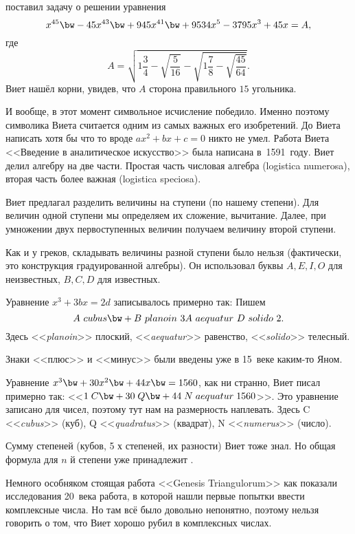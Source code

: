 \documentclass[a4paper,oneside,fleqn,10pt]{article}
\begin{document}
 поставил задачу о
решении уравнения
$$x^{45} \bw- 45x^{43} \bw+ 945x^{41} \bw+ 9534x^5 -3795x^3 + 45x =
A,$$ где
$$A = \sqrt{1\frac34-\sqrt{\frac{5}{16}} - \sqrt{1\frac78 -
    \sqrt{\frac{45}{64}}}}.$$ Виет нашёл корни, увидев, что $A$
сторона правильного $15$ угольника.

И вообще, в этот момент символьное исчисление победило.  Именно
поэтому символика Виета считается одним из самых важных его
изобретений.  До Виета написать хотя бы что то вроде $ax^2 + bx + c =
0$ никто не умел. Работа Виета <<Введение в аналитическое искусство>>
была написана в~1591~году. Виет делил алгебру на две части. Простая
часть числовая алгебра (logistica numerosa), вторая часть более важная
(logistica speciosa).

Виет предлагал разделить величины на ступени (по нашему степени).  Для
величин одной ступени мы определяем их сложение, вычитание.  Далее,
при умножении двух первоступенных величин получаем величину второй
ступени.

Как и у греков, складывать величины разной ступени было нельзя
(фактически, это конструкция градуированной алгебры). Он использовал
буквы $A, E, I, O$ для неизвестных, $B, C, D$ для известных.

\begin{ex}
Уравнение $x^3 + 3bx = 2d$ записывалось примерно так:
Пишем $$A~cubus\bw+B~planoin~3A~aequatur~D~solido~2.$$ Здесь
<<\emph{planoin}>> плоский, <<\emph{aequatur}>> равенство,
<<\emph{solido}>> телесный.
\end{ex}

\begin{note}
Знаки <<плюс>> и <<минус>> были введены уже в 15~веке каким-то Яном.
\end{note}

\begin{ex}
Уравнение $x^3 \bw+ 30 x^2 \bw+ 44 x \bw= 1560$, как ни странно, Виет
писал примерно так: <<$1\;C \bw+ 30\;Q \bw+ 44\;N\;aequatur\;1560$>>.
Это уравнение записано для чисел, поэтому тут нам на размерность
наплевать.  Здесь C <<\emph{cubus}>> (куб), Q <<\emph{quadratus}>>
(квадрат), N <<\emph{numerus}>> (число).
\end{ex}

Сумму степеней (кубов, 5 х степеней, их разности) Виет тоже знал.  Но
общая формула для $n$ й степени уже принадлежит
.

Немного особняком стоящая работа  <<Genesis
Triangulorum>> как показали исследования 20~века работа, в которой
нашли первые попытки ввести комплексные числа.  Но там всё было
довольно непонятно, поэтому нельзя говорить о том, что Виет хорошо
рубил в комплексных числах.
\end{document}

